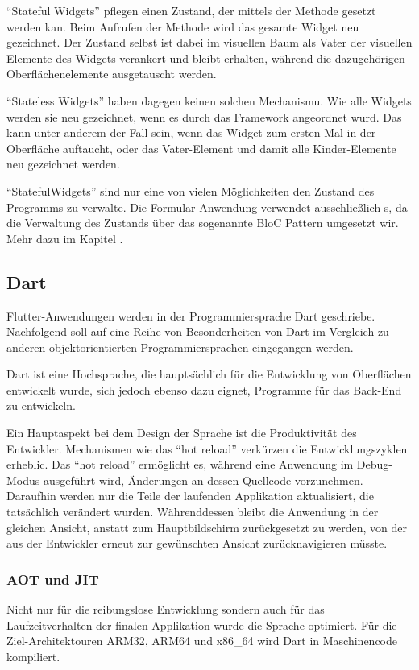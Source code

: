 \enquote{Stateful Widgets} pflegen einen Zustand, der mittels der Methode  gesetzt werden kan.
Beim Aufrufen der Methode wird das gesamte Widget neu gezeichnet.
Der Zustand selbst ist dabei im visuellen Baum als Vater der visuellen Elemente des Widgets verankert und bleibt erhalten, während die dazugehörigen Oberflächenelemente ausgetauscht werden.

\enquote{Stateless Widgets} haben dagegen keinen solchen Mechanismu.
Wie alle Widgets werden sie neu gezeichnet, wenn es durch das Framework angeordnet wurd.
Das kann unter anderem der Fall sein, wenn das Widget zum ersten Mal in der Oberfläche auftaucht, oder das Vater-Element und damit alle Kinder-Elemente neu gezeichnet werden.

\enquote{StatefulWidgets} sind nur eine von vielen Möglichkeiten den Zustand des Programms zu verwalte.
Die Formular-Anwendung verwendet ausschließlich s, da die Verwaltung des Zustands über das sogenannte BloC Pattern umgesetzt wir.
Mehr dazu im Kapitel .


\subsection{Dart}

Flutter-Anwendungen werden in der Programmiersprache Dart geschriebe.
Nachfolgend soll auf eine Reihe von Besonderheiten von Dart im Vergleich zu anderen objektorientierten Programmiersprachen eingegangen werden.

Dart ist eine Hochsprache, die hauptsächlich für die Entwicklung von Oberflächen entwickelt wurde, sich jedoch ebenso dazu eignet, Programme für das Back-End zu entwickeln.

Ein Hauptaspekt bei dem Design der Sprache ist die Produktivität des Entwickler.
Mechanismen wie das \enquote{hot reload} verkürzen die Entwicklungszyklen erheblic.
Das \enquote{hot reload} ermöglicht es, während eine Anwendung im Debug-Modus ausgeführt wird, Änderungen an dessen Quellcode vorzunehmen.
Daraufhin werden nur die Teile der laufenden Applikation aktualisiert, die tatsächlich verändert wurden.
 Währenddessen bleibt die Anwendung in der gleichen Ansicht, anstatt zum Hauptbildschirm zurückgesetzt zu werden, von der aus der Entwickler erneut zur gewünschten Ansicht zurücknavigieren müsste.

\subsubsection{AOT und JIT}
Nicht nur für die reibungslose Entwicklung sondern auch für das Laufzeitverhalten der finalen Applikation wurde die Sprache optimiert.
Für die Ziel-Architektouren ARM32, ARM64 und x86_64 wird Dart in Maschinencode kompiliert.


